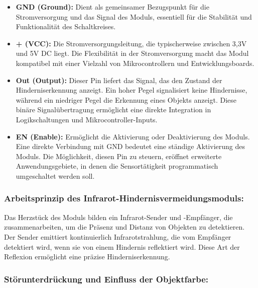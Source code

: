 \documentclass{vorlage-design-main}
\begin{document}
\begin{itemize}

\item
  \textbf{GND (Ground):} Dient als gemeinsamer Bezugspunkt für die
  Stromversorgung und das Signal des Moduls, essentiell für die
  Stabilität und Funktionalität des Schaltkreises.
\item
  \textbf{+ (VCC):} Die Stromversorgungsleitung, die typischerweise
  zwischen 3,3V und 5V DC liegt. Die Flexibilität in der Stromversorgung
  macht das Modul kompatibel mit einer Vielzahl von Mikrocontrollern und
  Entwicklungsboards.
\item
  \textbf{Out (Output):} Dieser Pin liefert das Signal, das den Zustand
  der Hinderniserkennung anzeigt. Ein hoher Pegel signalisiert keine
  Hindernisse, während ein niedriger Pegel die Erkennung eines Objekts
  anzeigt. Diese binäre Signalübertragung ermöglicht eine direkte
  Integration in Logikschaltungen und Mikrocontroller-Inputs.
\item
  \textbf{EN (Enable):} Ermöglicht die Aktivierung oder Deaktivierung
  des Moduls. Eine direkte Verbindung mit GND bedeutet eine ständige
  Aktivierung des Moduls. Die Möglichkeit, diesen Pin zu steuern,
  eröffnet erweiterte Anwendungsgebiete, in denen die Sensortätigkeit
  programmatisch umgeschaltet werden soll.
\end{itemize}

\hypertarget{arbeitsprinzip-des-infrarot-hindernisvermeidungsmoduls}{%
\subsubsection{Arbeitsprinzip des
Infrarot-Hindernisvermeidungsmoduls:}\label{arbeitsprinzip-des-infrarot-hindernisvermeidungsmoduls}}

Das Herzstück des Moduls bilden ein Infrarot-Sender und -Empfänger, die
zusammenarbeiten, um die Präsenz und Distanz von Objekten zu
detektieren. Der Sender emittiert kontinuierlich Infrarotstrahlung, die
vom Empfänger detektiert wird, wenn sie von einem Hindernis reflektiert
wird. Diese Art der Reflexion ermöglicht eine präzise
Hinderniserkennung.

\hypertarget{stuxf6runterdruxfcckung-und-einfluss-der-objektfarbe}{%
\subsubsection{Störunterdrückung und Einfluss der
Objektfarbe:}\label{stoerunterdrueckung-und-einfluss-der-objektfarbe}}
\end{document}
